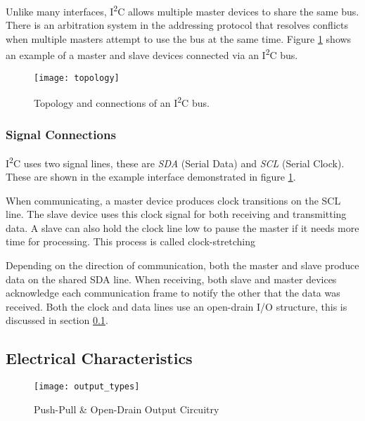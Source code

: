 \documentclass[11pt,fleqn]{book} %
\begin{document}
           Unlike many interfaces, I\textsuperscript{2}C allows multiple master devices to share the same bus. There is an arbitration system in the addressing protocol that resolves conflicts when multiple masters attempt to use the bus at the same time. Figure \ref{topology} shows an example of a master and slave devices connected via an I\textsuperscript{2}C bus. 

            \begin{figure}[]
                \centering\texttt{[image: topology]}
                \caption{Topology and connections of an I\textsuperscript{2}C bus.}
                \label{topology}
            \end{figure}
            
        \subsubsection{Signal Connections}
            I\textsuperscript{2}C uses two signal lines, these are \textit{SDA} (Serial Data) and \textit{SCL} (Serial Clock). These are shown in the example interface demonstrated in figure \ref{topology}. 
            
            When communicating, a master device produces clock transitions on the SCL line. The slave device uses this clock signal for both receiving and transmitting data. A slave can also hold the clock line low to pause the master if it needs more time for processing. This process is called clock-stretching
            
            Depending on the direction of communication, both the master and slave produce data on the shared SDA line. When receiving, both slave and master devices acknowledge each communication frame to notify the other that the data was received.  Both the clock and data lines use an open-drain I/O structure, this is discussed in section \ref{electrical}. 
            
    \subsection{Electrical Characteristics} \label{electrical}
        \begin{figure}[]
            \centering\texttt{[image: output\_types]}
            \caption{Push-Pull \& Open-Drain Output Circuitry}
            \label{output_circuit}
        \end{figure}
        
\end{document}
